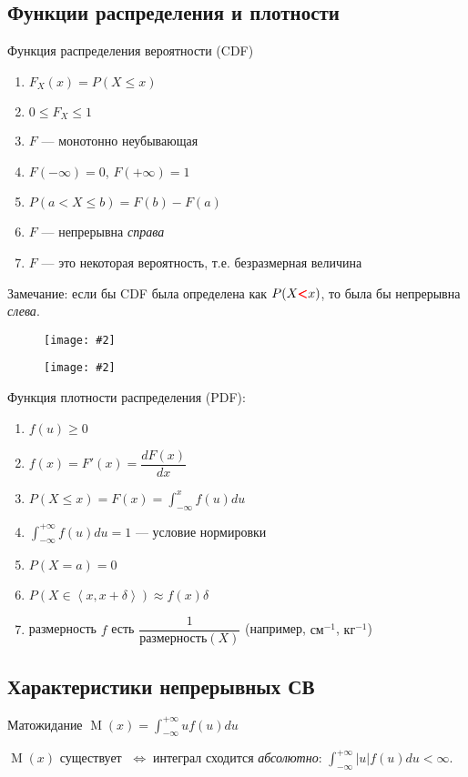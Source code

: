 \documentclass[a4paper,12pt,fleqn]{article}
\newenvironment{onsamepage} {\begin{minipage}{\textwidth}} {\end{minipage}}
\numberwithin{figure}{section}
\newcommand\cfigure[2]{
	\begin{figure}[H] \centering \texttt{[image: \#2]} \end{figure}
}
\theoremstyle{definition}
\let\leqs\leqslant
\let\geqs\geqslant
\let\DS\displaystyle
\DeclareMathOperator{\M}{M}
\def\iff{$\;\Longleftrightarrow\;$}
\begin{document}
\subsection{Функции распределения и плотности}

Функция распределения вероятности (CDF)
\begin{enumerate}
	\item $F_X(x) = P(X \leqs x)$
	\item $0\leqs F_X \leqs 1$
	\item $F$ --- монотонно неубывающая
	\item $F(-\infty)=0$, $F(+\infty)=1$
	\item $P(a< X \leqs b) = F(b)-F(a)$
	\item $F$ --- непрерывна \textit{справа}
	\item $F$ --- это некоторая вероятность, т.е. безразмерная величина
\end{enumerate}

Замечание: если бы CDF была определена как
$P(X {\pmb{\textcolor{red}<}} x)$,
то была бы непрерывна \textit{слева}.

\cfigure{11cm}{cdf-example-big.png}

\cfigure{6cm}{cdf-example-small.jpg}

Функция плотности распределения (PDF):
\begin{enumerate}
	\item $f(u) \geqs 0$
	\item $f(x)=F'(x)=\dfrac{dF(x)}{dx}$
	\item $\DS P(X\leqs x)=F(x)=\int_{-\infty}^{x}f(u)du$
	\item $\DS \int_{-\infty}^{+\infty}f(u)du=1$ --- условие нормировки
	\item $P(X=a)=0$
	\item $P(X \in \left<x,x+\delta\right>) \approx f(x) \delta$
	\item размерность $f$ есть $\dfrac{1}{\text{размерность}(X)}$
		  (например, $\text{см}^{-1}$, $\text{кг}^{-1}$)
\end{enumerate}


\subsection{Характеристики непрерывных СВ}

\begin{onsamepage}
Матожидание $\M(x)=\int_{-\infty}^{+\infty}uf(u)du$

$\M(x)$ существует \iff интеграл сходится \textit{абсолютно}:
$\int_{-\infty}^{+\infty}|u|f(u)du < \infty$.
\end{onsamepage}
\end{document}
